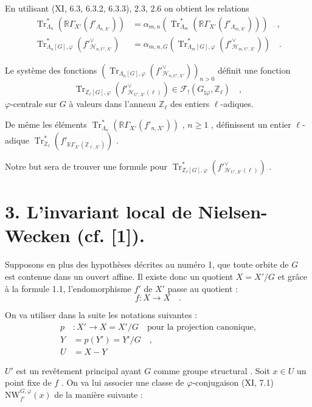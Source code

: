 \documentclass[11pt]{article}
\newcommand{\R}{\mathbb{R}}\newcommand{\RHomCore}{\mathbb{R}\mathrm{Hom}}
\providecommand{\Tr}{\operatorname{Tr}}
\providecommand{\Tr}{\operatorname{Tr}}
\providecommand{\Tr}{\operatorname{Tr}}
\providecommand{\R}{\mathrm R}
\providecommand{\Tr}{\operatorname{Tr}}
\providecommand{\La}{\Lambda}
\providecommand{\bZ}{\mathbb Z}
\providecommand{\Tr}{\operatorname{Tr}}
\begin{document}
En utilisant (XI, 6.3, 6.3.2, 6.3.3), 2.3, 2.6 on obtient les relations
\begin{align}
\tag{2.7} \Tr^*_{\La_n}(\R\Gamma_{X'}(f'_{\La_{n,X'}})) &= \alpha_{m,n}(\Tr^*_{\La_m}(\R\Gamma_{X'}(f'_{\La_{m,X'}}))) \quad , \\
\tag{2.8} \Tr^*_{\La_n[G],\varphi}(f'^\vee_{\mathcal{H}_{n,U',X'}}) &= \alpha_{m,n,G}(\Tr^*_{\La_m[G],\varphi}(f'^\vee_{\mathcal{H}_{m,U',X'}})) \quad .
\end{align}

Le système des fonctions $(\Tr_{\La_n[G],\varphi}(f'^\vee_{\mathcal{H}_{n,U',X'}}))_{n>0}$ définit une fonction
\[
\Tr_{\bZ_\ell[G],\varphi}(f'^\vee_{\mathcal{H}_{U',X'}(\ell)}) \in \mathcal{F}_!(G_{\natural\varphi}, \bZ_\ell) \quad ,
\]
$\varphi$-centrale sur $G$ à valeurs dans l'anneau $\bZ_\ell$ des entiers $\ell$-adiques.

De même les éléments $\Tr^*_{\La_n}(\R\Gamma_{X'}(f'_{n,X'}))$ , $n \geq 1$ , définissent un entier $\ell$-adique $\Tr^*_{\bZ_\ell}(f'_{\R\Gamma_{X'}(\bZ_{\ell,X'})})$ .

Notre but sera de trouver une formule pour $\Tr^*_{\bZ_\ell[G],\varphi}(f'^\vee_{\mathcal{H}_{U',X'}(\ell)})$ .


\section*{3. L'invariant local de Nielsen-Wecken (cf. [1]).}
Supposons en plus des hypothèses décrites au numéro 1, que toute orbite de $G$ est contenue dans un ouvert affine. Il existe donc un quotient $X = X'/G$ et grâce à la formule 1.1, l'endomorphisme $f'$ de $X'$ passe au quotient :
\[
f : X \longrightarrow X \quad .
\]

On va utiliser dans la suite les notations suivantes :
\begin{align*}
p &: X' \longrightarrow X = X'/G \quad
\text{pour la projection canonique,} \\
Y &= p(Y') = Y'/G \quad , \\
U &= X - Y
\end{align*}

$U'$ est un revêtement principal ayant $G$ comme groupe structural . Soit $x \in U$ un point fixe de $f$ . On va lui associer une classe de $\varphi$-conjugaison (XI, 7.1) $\mathrm{NW}_{f'}^{G,\varphi}(x)$ de la manière suivante :
\end{document}
